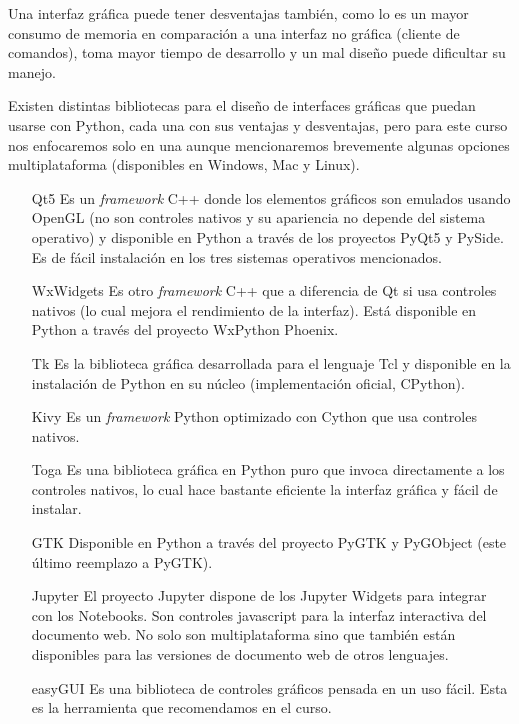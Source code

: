 Una interfaz gráfica puede tener desventajas también, como lo es un mayor consumo de
memoria en comparación a una interfaz no gráfica (cliente de comandos), toma mayor tiempo
de desarrollo y un mal diseño puede dificultar su manejo.

Existen distintas bibliotecas para el diseño de interfaces gráficas que puedan
usarse con Python, cada una con sus ventajas y desventajas, pero para este curso
nos enfocaremos solo en una aunque mencionaremos brevemente algunas opciones multiplataforma
(disponibles en Windows, Mac y Linux).

\begin{itemize}
    \item[Qt5] Es un \textit{framework} C++ donde los elementos gráficos son emulados
    usando OpenGL (no son controles nativos y su apariencia no depende del sistema operativo)
    y disponible en Python a través de los proyectos PyQt5 y PySide. Es de fácil instalación
    en los tres sistemas operativos mencionados.
    \item[WxWidgets] Es otro \textit{framework} C++ que a diferencia de Qt si usa controles
    nativos (lo cual mejora el rendimiento de la interfaz). Está disponible en Python a través del
    proyecto WxPython Phoenix.
    \item[Tk] Es la biblioteca gráfica desarrollada para el lenguaje Tcl y disponible en la instalación
    de Python en su núcleo (implementación oficial, CPython).
    \item[Kivy] Es un \textit{framework} Python optimizado con Cython que usa controles nativos.
    \item[Toga] Es una biblioteca gráfica en Python puro que invoca directamente a los controles nativos,
    lo cual hace bastante eficiente la interfaz gráfica y fácil de instalar.
    \item[GTK] Disponible en Python a través del proyecto PyGTK y PyGObject (este último reemplazo a PyGTK).
    \item[Jupyter] El proyecto Jupyter dispone de los Jupyter Widgets para integrar con los Notebooks. Son
    controles javascript para la interfaz interactiva del documento web. No solo son multiplataforma sino que
    también están disponibles para las versiones de documento web de otros lenguajes.
    \item[easyGUI] Es una biblioteca de controles gráficos pensada en un uso fácil. Esta es la herramienta
    que recomendamos en el curso.
\end{itemize}

